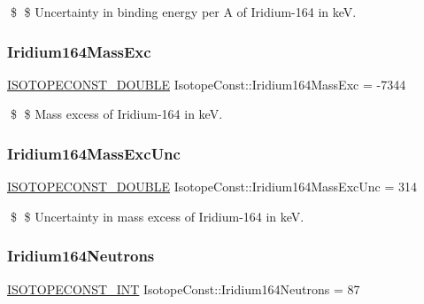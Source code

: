 \$ \$ Uncertainty in binding energy per A of Iridium-\/164 in keV. \mbox{\label{group___isotope_const-_iridium-_ir164_gac3dddfa7dea16567572ae5391c126623}} 
\subsubsection{\texorpdfstring{Iridium164\+Mass\+Exc}{Iridium164MassExc}}
{\footnotesize\ttfamily \mbox{\hyperlink{group___isotope_const-_macros_ga8f45a7272ce02c0b4c65c44636ed719a}{I\+S\+O\+T\+O\+P\+E\+C\+O\+N\+S\+T\+\_\+\+D\+O\+U\+B\+LE}} Isotope\+Const\+::\+Iridium164\+Mass\+Exc = -\/7344}

\$ \$ Mass excess of Iridium-\/164 in keV. \mbox{\label{group___isotope_const-_iridium-_ir164_ga27e3a8441d6b7c936442c337470ece2f}} 
\subsubsection{\texorpdfstring{Iridium164\+Mass\+Exc\+Unc}{Iridium164MassExcUnc}}
{\footnotesize\ttfamily \mbox{\hyperlink{group___isotope_const-_macros_ga8f45a7272ce02c0b4c65c44636ed719a}{I\+S\+O\+T\+O\+P\+E\+C\+O\+N\+S\+T\+\_\+\+D\+O\+U\+B\+LE}} Isotope\+Const\+::\+Iridium164\+Mass\+Exc\+Unc = 314}

\$ \$ Uncertainty in mass excess of Iridium-\/164 in keV. \mbox{\label{group___isotope_const-_iridium-_ir164_gafe56c1e730974eb22f1aac262970c6f3}} 
\subsubsection{\texorpdfstring{Iridium164\+Neutrons}{Iridium164Neutrons}}
{\footnotesize\ttfamily \mbox{\hyperlink{group___isotope_const-_macros_ga5f18360b3e99483a35c32d789e62621c}{I\+S\+O\+T\+O\+P\+E\+C\+O\+N\+S\+T\+\_\+\+I\+NT}} Isotope\+Const\+::\+Iridium164\+Neutrons = 87}

